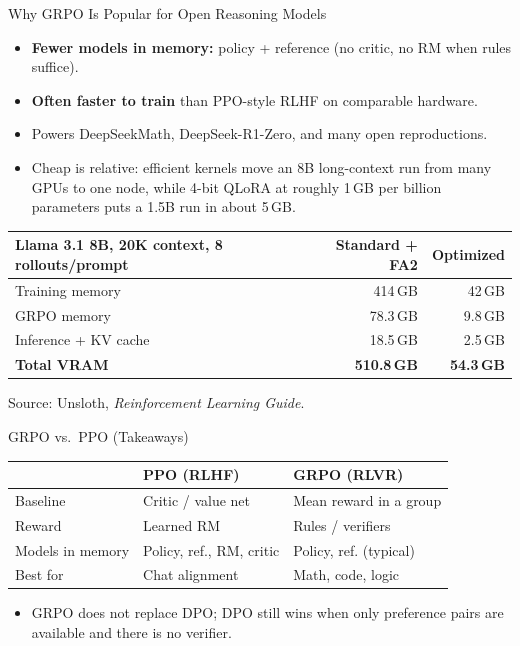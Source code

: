 \begin{frame}{Why GRPO Is Popular for Open Reasoning Models}
  \begin{itemize}\itemsep0.3em
    \item[\textcolor{red}{$\blacktriangleright$}] \textbf{Fewer models in memory:} policy + reference (no critic, no RM when rules suffice).
    \item[\textcolor{red}{$\blacktriangleright$}] \textbf{Often faster to train} than PPO-style RLHF on comparable hardware.
    \item[\textcolor{red}{$\blacktriangleright$}] Powers DeepSeekMath, DeepSeek-R1-Zero, and many open reproductions.
    \item[\textcolor{red}{$\blacktriangleright$}] Cheap is relative: efficient kernels move an 8B long-context run from many GPUs to one node, while 4-bit QLoRA at roughly 1\,GB per billion parameters puts a 1.5B run in about 5\,GB.
  \end{itemize}
  \vspace{0.25em}
  \small
  \begin{tabular}{@{}lrr@{}}
    \toprule
    \textbf{Llama 3.1 8B, 20K context, 8 rollouts/prompt} & \textbf{Standard + FA2} & \textbf{Optimized} \\
    \midrule
    Training memory & 414\,GB & 42\,GB \\
    GRPO memory & 78.3\,GB & 9.8\,GB \\
    Inference + KV cache & 18.5\,GB & 2.5\,GB \\
    \midrule
    \textbf{Total VRAM} & \textbf{510.8\,GB} & \textbf{54.3\,GB} \\
    \bottomrule
  \end{tabular}
  \vspace{0.15em}

  {\scriptsize Source: Unsloth, \emph{Reinforcement Learning Guide}.}
\end{frame}

\begin{frame}{GRPO vs.\ PPO (Takeaways)}
  \small
  \setlength{\tabcolsep}{5pt}%
  \begin{tabular}{@{}p{}p{}p{}@{}}
    \toprule
    & \textbf{PPO (RLHF)} & \textbf{GRPO (RLVR)} \\
    \midrule
    Baseline & Critic / value net & Mean reward in a group \\
    Reward & Learned RM & Rules / verifiers \\
    Models in memory & Policy, ref., RM, critic & Policy, ref. (typical) \\
    Best for & Chat alignment & Math, code, logic \\
    \bottomrule
  \end{tabular}
  \vspace{0.5em}
  \begin{itemize}\itemsep0.3em
    \item[\textcolor{red}{$\blacktriangleright$}] GRPO does not replace DPO; DPO still wins when only preference pairs are available and there is no verifier.
  \end{itemize}
\end{frame}

